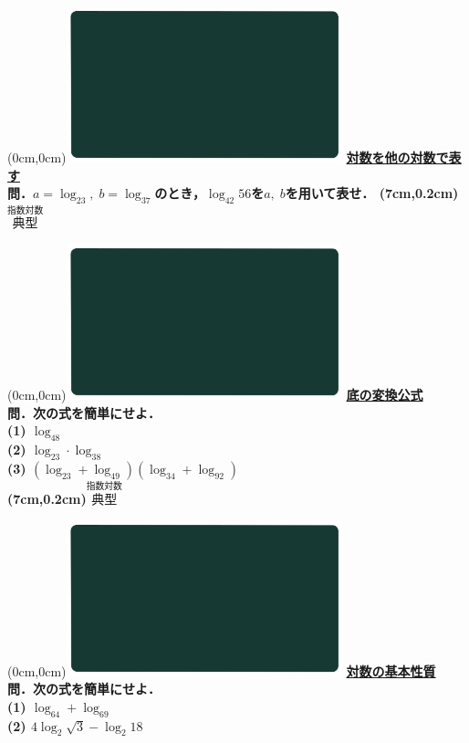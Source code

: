 \documentclass[10pt,
fleqn,
dvipdfmx,
uplatex
]{jsarticle}
\begin{document}
\at(0cm,0cm){\includegraphics[width=8cm,bb=0 0 1920 1080]{./media_local/smart_background/指数対数.jpeg}}
{\color{orange}\bf\boldmath\Large\underline{対数を他の対数で表す}}\vspace{0.3zw}\\
\LARGE 
\bf\boldmath 問．$a=\log _23,\;b=\log _37$のとき，$\log _{42}{56}$を$a,\;b$を用いて表せ．
\at(7cm,0.2cm){\small\color{bradorange}$\overset{\text{指数対数}}{\text{典型}}$}


\newpage



\at(0cm,0cm){\includegraphics[width=8cm,bb=0 0 1920 1080]{./media_local/smart_background/指数対数.jpeg}}
{\color{orange}\bf\boldmath\Large\underline{底の変換公式}}\vspace{0.3zw}\\
\large 
\bf\boldmath 問．次の式を簡単にせよ．\\
(1)  $\log _48$\\
(2)  $\log _23\cdot \log _38$\\
(3)  $\left(\log _23+\log _49\right)\left(\log _34+\log _92\right)$\\

\at(7cm,0.2cm){\small\color{bradorange}$\overset{\text{指数対数}}{\text{典型}}$}


\newpage



\at(0cm,0cm){\includegraphics[width=8cm,bb=0 0 1920 1080]{./media_local/smart_background/指数対数.jpeg}}
{\color{orange}\bf\boldmath\Large\underline{対数の基本性質}}\vspace{0.3zw}\\
\LARGE
\bf\boldmath 問．次の式を簡単にせよ．\\
(1)  $\log _64+\log _69$\\
(2)  $4\log _2\sqrt 3-\log _2{18}$\\
\end{document}
